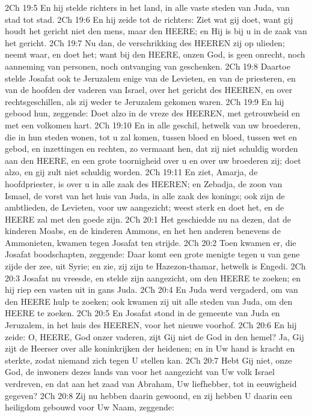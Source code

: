 2Ch 19:5  En hij stelde richters in het land, in alle vaste steden van Juda, van stad tot stad.
2Ch 19:6  En hij zeide tot de richters: Ziet wat gij doet, want gij houdt het gericht niet den mens, maar den HEERE; en Hij is bij u in de zaak van het gericht.
2Ch 19:7  Nu dan, de verschrikking des HEEREN zij op ulieden; neemt waar, en doet het; want bij den HEERE, onzen God, is geen onrecht, noch aanneming van personen, noch ontvanging van geschenken.
2Ch 19:8  Daartoe stelde Josafat ook te Jeruzalem enige van de Levieten, en van de priesteren, en van de hoofden der vaderen van Israel, over het gericht des HEEREN, en over rechtsgeschillen, als zij weder te Jeruzalem gekomen waren.
2Ch 19:9  En hij gebood hun, zeggende: Doet alzo in de vreze des HEEREN, met getrouwheid en met een volkomen hart.
2Ch 19:10  En in alle geschil, hetwelk van uw broederen, die in hun steden wonen, tot u zal komen, tussen bloed en bloed, tussen wet en gebod, en inzettingen en rechten, zo vermaant hen, dat zij niet schuldig worden aan den HEERE, en een grote toornigheid over u en over uw broederen zij; doet alzo, en gij zult niet schuldig worden.
2Ch 19:11  En ziet, Amarja, de hoofdpriester, is over u in alle zaak des HEEREN; en Zebadja, de zoon van Ismael, de vorst van het huis van Juda, in alle zaak des konings; ook zijn de ambtlieden, de Levieten, voor uw aangezicht; weest sterk en doet het, en de HEERE zal met den goede zijn.
2Ch 20:1  Het geschiedde nu na dezen, dat de kinderen Moabs, en de kinderen Ammons, en het hen anderen benevens de Ammonieten, kwamen tegen Josafat ten strijde.
2Ch 20:2  Toen kwamen er, die Josafat boodschapten, zeggende: Daar komt een grote menigte tegen u van gene zijde der zee, uit Syrie; en zie, zij zijn te Hazezon-thamar, hetwelk is Engedi.
2Ch 20:3  Josafat nu vreesde, en stelde zijn aangezicht, om den HEERE te zoeken; en hij riep een vasten uit in gans Juda.
2Ch 20:4  En Juda werd vergaderd, om van den HEERE hulp te zoeken; ook kwamen zij uit alle steden van Juda, om den HEERE te zoeken.
2Ch 20:5  En Josafat stond in de gemeente van Juda en Jeruzalem, in het huis des HEEREN, voor het nieuwe voorhof.
2Ch 20:6  En hij zeide: O, HEERE, God onzer vaderen, zijt Gij niet de God in den hemel? Ja, Gij zijt de Heerser over alle koninkrijken der heidenen; en in Uw hand is kracht en sterkte, zodat niemand zich tegen U stellen kan.
2Ch 20:7  Hebt Gij niet, onze God, de inwoners dezes lands van voor het aangezicht van Uw volk Israel verdreven, en dat aan het zaad van Abraham, Uw liefhebber, tot in eeuwigheid gegeven?
2Ch 20:8  Zij nu hebben daarin gewoond, en zij hebben U daarin een heiligdom gebouwd voor Uw Naam, zeggende:
